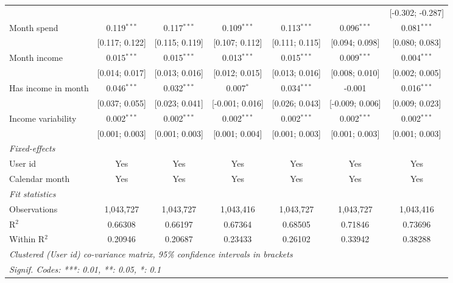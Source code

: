 \begin{table}[htbp]
\begin{threeparttable}[b]
\begin{tabular}{lcccccc}
                                    &                  &                &                 &                  &                  & [-0.302; -0.287]\\   
         Month spend                & 0.119$^{***}$    & 0.117$^{***}$  & 0.109$^{***}$   & 0.113$^{***}$    & 0.096$^{***}$    & 0.081$^{***}$\\   
                                    & [0.117; 0.122]   & [0.115; 0.119] & [0.107; 0.112]  & [0.111; 0.115]   & [0.094; 0.098]   & [0.080; 0.083]\\   
         Month income               & 0.015$^{***}$    & 0.015$^{***}$  & 0.013$^{***}$   & 0.015$^{***}$    & 0.009$^{***}$    & 0.004$^{***}$\\   
                                    & [0.014; 0.017]   & [0.013; 0.016] & [0.012; 0.015]  & [0.013; 0.016]   & [0.008; 0.010]   & [0.002; 0.005]\\   
         Has income in month        & 0.046$^{***}$    & 0.032$^{***}$  & 0.007$^{*}$     & 0.034$^{***}$    & -0.001           & 0.016$^{***}$\\   
                                    & [0.037; 0.055]   & [0.023; 0.041] & [-0.001; 0.016] & [0.026; 0.043]   & [-0.009; 0.006]  & [0.009; 0.023]\\   
         Income variability         & 0.002$^{***}$    & 0.002$^{***}$  & 0.002$^{***}$   & 0.002$^{***}$    & 0.002$^{***}$    & 0.002$^{***}$\\   
                                    & [0.001; 0.003]   & [0.001; 0.003] & [0.001; 0.004]  & [0.001; 0.003]   & [0.001; 0.003]   & [0.001; 0.003]\\   
         \midrule
         \emph{Fixed-effects}\\
         User id                    & Yes              & Yes            & Yes             & Yes              & Yes              & Yes\\  
         Calendar month             & Yes              & Yes            & Yes             & Yes              & Yes              & Yes\\  
         \midrule
         \emph{Fit statistics}\\
         Observations               & 1,043,727        & 1,043,727      & 1,043,416       & 1,043,727        & 1,043,727        & 1,043,416\\  
         R$^2$                      & 0.66308          & 0.66197        & 0.67364         & 0.68505          & 0.71846          & 0.73696\\  
         Within R$^2$               & 0.20946          & 0.20687        & 0.23433         & 0.26102          & 0.33942          & 0.38288\\  
         \midrule \midrule
         \multicolumn{7}{l}{\emph{Clustered (User id) co-variance matrix, 95\% confidence intervals in brackets}}\\
         \multicolumn{7}{l}{\emph{Signif. Codes: ***: 0.01, **: 0.05, *: 0.1}}\\
      \end{tabular}
   \end{threeparttable}
\end{table}


